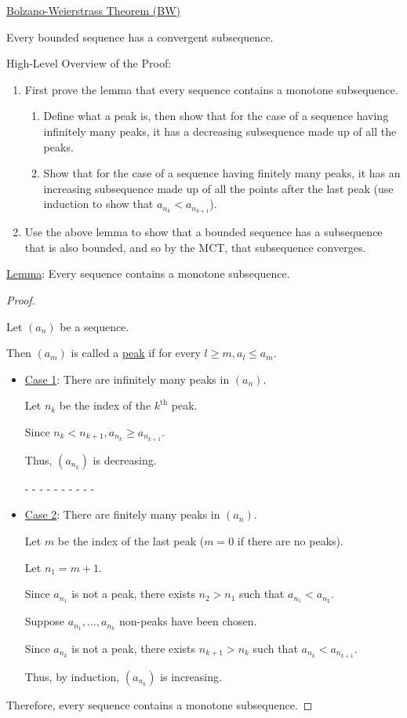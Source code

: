 \documentclass[12pt]{article}
\begin{document}
\pagebreak

\underline{Bolzano-Weierstrass Theorem (BW)}

Every bounded sequence has a convergent subsequence.

\dotfill

High-Level Overview of the Proof:

\begin{enumerate}
\item First prove the lemma that every sequence contains a monotone subsequence.
\begin{enumerate}
\item Define what a peak is, then show that for the case of a sequence having infinitely many peaks, it has a decreasing subsequence made up of all the peaks.

\item Show that for the case of a sequence having finitely many peaks, it has an increasing subsequence made up of all the points after the last peak (use induction to show that $a_{n_k} < a_{n_{k + 1}}$).
\end{enumerate}

\item Use the above lemma to show that a bounded sequence has a subsequence that is also bounded, and so by the MCT, that subsequence converges.
\end{enumerate}

\dotfill

\underline{Lemma}: Every sequence contains a monotone subsequence.
\begin{proof}
$ $

Let $(a_n)$ be a sequence.

Then $(a_m)$ is called a \underline{peak} if for every $l \ge m, a_l \le a_m$.

\begin{itemize}
\item \underline{Case 1}: There are infinitely many peaks in $(a_n)$.

Let $n_k$ be the index of the $k^{\text{th}}$ peak.

Since $n_k < n_{k + 1}, a_{n_k} \ge a_{n_{k + 1}}$.

Thus, $(a_{n_k})$ is decreasing.

- - - - - - - - - -

\item \underline{Case 2}: There are finitely many peaks in $(a_n)$.

Let $m$ be the index of the last peak ($m = 0$ if there are no peaks).

Let $n_1 = m + 1$.

Since $a_{n_1}$ is not a peak, there exists $n_2 > n_1$ such that $a_{n_1} < a_{n_2}$.

Suppose $a_{n_1}, \dots, a_{n_k}$ non-peaks have been chosen.

Since $a_{n_k}$ is not a peak, there exists $n_{k + 1} > n_k$ such that $a_{n_k} < a_{n_{k + 1}}$.

Thus, by induction, $(a_{n_k})$ is increasing.
\end{itemize}

Therefore, every sequence contains a monotone subsequence.
\end{proof}
\end{document}
